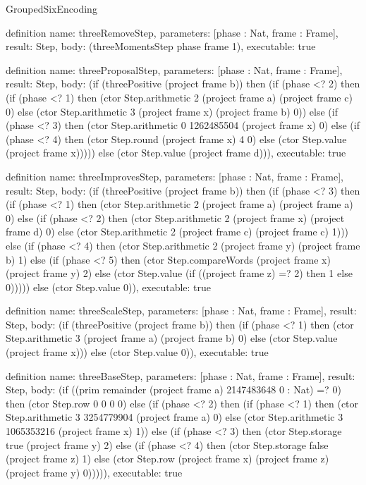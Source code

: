 \begin{lexlean}{GroupedSixEncoding}
\begin{semanticmodule}
definition{
  name: threeRemoveStep,
  parameters: [phase : Nat, frame : Frame],
  result: Step,
  body: (threeMomentsStep phase frame 1),
  executable: true
}

definition{
  name: threeProposalStep,
  parameters: [phase : Nat, frame : Frame],
  result: Step,
  body: (if (threePositive (project frame b)) then (if (phase <? 2) then (if (phase <? 1) then (ctor Step.arithmetic 2 (project frame a) (project frame c) 0) else (ctor Step.arithmetic 3 (project frame x) (project frame b) 0)) else (if (phase <? 3) then (ctor Step.arithmetic 0 1262485504 (project frame x) 0) else (if (phase <? 4) then (ctor Step.round (project frame x) 4 0) else (ctor Step.value (project frame x))))) else (ctor Step.value (project frame d))),
  executable: true
}

definition{
  name: threeImprovesStep,
  parameters: [phase : Nat, frame : Frame],
  result: Step,
  body: (if (threePositive (project frame b)) then (if (phase <? 3) then (if (phase <? 1) then (ctor Step.arithmetic 2 (project frame a) (project frame a) 0) else (if (phase <? 2) then (ctor Step.arithmetic 2 (project frame x) (project frame d) 0) else (ctor Step.arithmetic 2 (project frame c) (project frame c) 1))) else (if (phase <? 4) then (ctor Step.arithmetic 2 (project frame y) (project frame b) 1) else (if (phase <? 5) then (ctor Step.compareWords (project frame x) (project frame y) 2) else (ctor Step.value (if ((project frame z) =? 2) then 1 else 0))))) else (ctor Step.value 0)),
  executable: true
}

definition{
  name: threeScaleStep,
  parameters: [phase : Nat, frame : Frame],
  result: Step,
  body: (if (threePositive (project frame b)) then (if (phase <? 1) then (ctor Step.arithmetic 3 (project frame a) (project frame b) 0) else (ctor Step.value (project frame x))) else (ctor Step.value 0)),
  executable: true
}

definition{
  name: threeBaseStep,
  parameters: [phase : Nat, frame : Frame],
  result: Step,
  body: (if ((prim remainder (project frame a) 2147483648 0 : Nat) =? 0) then (ctor Step.row 0 0 0 0) else (if (phase <? 2) then (if (phase <? 1) then (ctor Step.arithmetic 3 3254779904 (project frame a) 0) else (ctor Step.arithmetic 3 1065353216 (project frame x) 1)) else (if (phase <? 3) then (ctor Step.storage true (project frame y) 2) else (if (phase <? 4) then (ctor Step.storage false (project frame z) 1) else (ctor Step.row (project frame x) (project frame z) (project frame y) 0))))),
  executable: true
}


\end{semanticmodule}
\end{lexlean}
